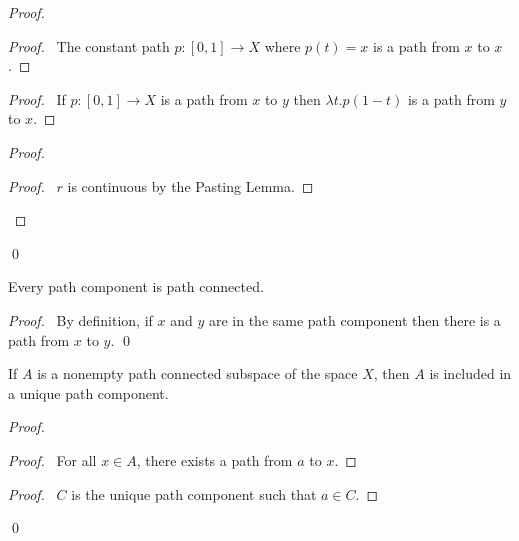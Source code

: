 \begin{proof}
  \pf
  \begin{proof}
    \pf\ The constant path $p : [0,1] \rightarrow X$ where $p(t) = x$ is a
    path from $x$ to $x$.
  \end{proof}
  \begin{proof}
    \pf\ If $p : [0,1] \rightarrow X$ is a path from $x$ to $y$ then $\lambda
    t. p(1-t)$ is a path from $y$ to $x$.
  \end{proof}
  \begin{proof}
    \begin{proof}
      \pf\ $r$ is continuous by the Pasting Lemma.
    \end{proof}
  \end{proof}
  \qed
\end{proof}

\begin{prop}
  Every path component is path connected.
\end{prop}

\begin{proof}
  \pf\ By definition, if $x$ and $y$ are in the same path component then
  there
  is a path from $x$ to $y$. \qed
\end{proof}

\begin{prop}
  \label{prop:topology:path_connected:subset}
  If $A$ is a nonempty path connected subspace of the space $X$, then $A$ is
  included in a unique path component.
\end{prop}

\begin{proof}
  \pf
  \begin{proof}
    \pf\ For all $x \in A$, there exists a path from $a$ to $x$.
  \end{proof}
  \begin{proof}
    \pf\ $C$ is the unique path component such that $a \in C$.
  \end{proof}
  \qed
\end{proof}

